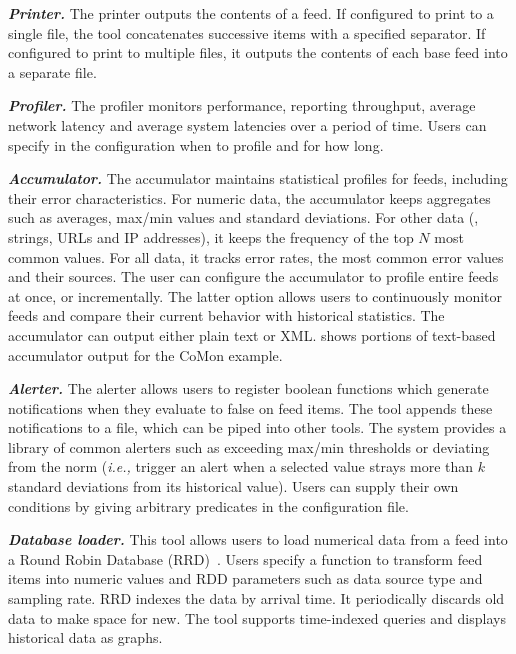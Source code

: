 \textbf{\textit{Printer.}} The printer outputs the contents of a
feed.  If configured to print to a single file, the tool concatenates
successive items with a specified separator. If configured to print to
multiple files, it outputs the contents of each base feed into a
separate file. 


\textbf{\textit{Profiler.}} The profiler monitors performance, reporting
throughput, average network latency and average system latencies
over a period of time. Users can specify in the configuration 
when to profile and for how long.  

\textbf{\textit{Accumulator.}} The accumulator
maintains statistical profiles for feeds, including their error characteristics. For
numeric data, the accumulator keeps aggregates such
as averages, max/min values and standard deviations. For other
data (\eg{}, strings, URLs and IP addresses), it keeps the
frequency of the top $N$ most common values. For all data, it
tracks error rates, the most common error values and their
sources.  The user can configure the accumulator to profile entire
feeds at once, or incrementally. The latter option 
allows users to continuously monitor feeds
and compare their current behavior with historical statistics.  The
accumulator can output either plain text or XML. 
 shows portions of text-based accumulator output
for the CoMon example.

\textbf{\textit{Alerter.}} The alerter allows users to register boolean 
functions which generate notifications when they evaluate to false on
feed items. The tool appends these notifications to a file, which can
be piped into other tools.  The system provides a library of 
common alerters such as exceeding max/min thresholds or deviating from the norm
({\em i.e.,} trigger an alert when a selected value strays more than $k$
standard deviations from its historical value). 
Users can supply their own conditions by giving arbitrary \ocaml{} predicates
in the configuration file.

\textbf{\textit{Database loader.}} This tool allows users to load numerical
data from a feed into a Round Robin Database
(RRD)~\cite{rrdtool}. Users specify a function to transform
feed items into numeric values and RDD parameters such as data source 
type and sampling rate. RRD indexes the data by arrival time.  It
periodically discards old data to make space for new. The tool
supports time-indexed queries and displays historical data as graphs.

